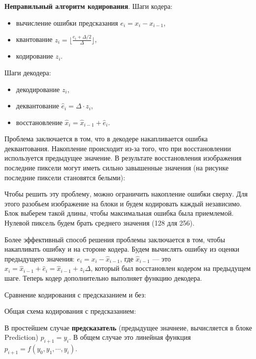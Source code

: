 {\textbf{Неправильный алгоритм кодирования}. Шаги кодера:
\begin{itemize}
    \item вычисление ошибки предсказания $e_i = x_i - x_{i-1}$,

    \item квантование $z_i = \lfloor \frac{e_i + \Delta / 2}{\Delta} \rfloor$,

    \item кодирование $z_i$.
\end{itemize}

Шаги декодера:
\begin{itemize}
    \item декодирование $z_i$,

    \item деквантование $\hat e_i = \Delta \cdot z_i$,

    \item восстановление $\hat x_i = \hat x_{i-1} + \hat e_i$.
\end{itemize}

Проблема заключается в том, что в декодере накапливается ошибка деквантования.
Накопление происходит из-за того, что при восстановлении используется
предыдущее значение. В результате восстановления изображения последние пиксели
могут иметь сильно завышенные значения (на рисунке последние пиксели становятся
белыми):


Чтобы решить эту проблему, можно ограничить накопление ошибки сверху. Для этого
разобьем изображение на блоки и будем кодировать каждый независимо. Блок
выберем такой длины, чтобы максимальная ошибка была приемлемой. Нулевой пиксель
будем брать среднего значения (128 для 256).

Более эффективный способ решения проблемы заключается в том, чтобы накапливать
ошибку и на стороне кодера. Будем вычислять ошибку из оценки предыдущего
значения: $e_i = x_i - \hat x_{i-1}$, где $\hat x_{i-1}$ --- это $\hat x_i =
\hat x_{i-1} + \hat e_i = \hat x_{i-1} + z_i \Delta$, который был восстановлен
кодером на предыдущем шаге. Теперь кодер дополнительно выполняет функцию
декодера.

Сравнение кодирования с предсказанием и без:



Общая схема кодирования с предсказанием:

В простейшем случае \textbf{предсказатель} (предыдущее значнеие, вычисляется в
блоке Prediction) $p_{i+1} = y_i$. В общем случае это линейная функция $p_{i+1}
= f(y_0, y_1, \cdots, y_i)$.

}
